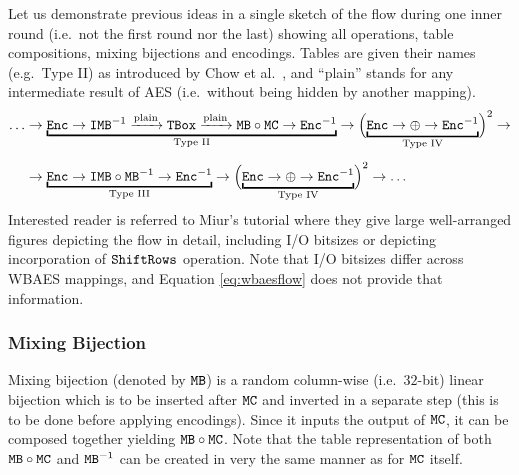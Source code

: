 	Let us demonstrate previous ideas in a single sketch of the flow during one inner round (i.e.\ not the first round nor the last) showing all operations, table compositions, mixing bijections and encodings. Tables are given their names (e.g.\ Type II) as introduced by Chow et al.\ \cite{chow2002aes}, and ``plain'' stands for any intermediate result of AES (i.e.\ without being hidden by another mapping).
	\begin{align}
	\label{eq:wbaesflow}
		\ldots&\rarr\underbracket{\Enc\rarr\IMB^{-1}\xrightarrow{\textnormal{plain}}\TBox\xrightarrow{\textnormal{plain}}\MB\circ\MC\rarr\Enc^{-1}}_{\textnormal{Type II}}\rarr\Bigl(\underbracket{\Enc\rarr\xor\rarr\Enc^{-1}}_{\textnormal{Type IV}}\Bigr)^2\rarr\nonumber\\[.5em]
		&\rarr\underbracket{\Enc\rarr\IMB\circ\MB^{-1}\rarr\Enc^{-1}}_{\textnormal{Type III}}\rarr\Bigl(\underbracket{\Enc\rarr\xor\rarr\Enc^{-1}}_{\textnormal{Type IV}}\Bigr)^2\rarr\ldots
	\end{align}
	Interested reader is referred to Miur's tutorial \cite{muir2013tutorial} where they give large well-arranged figures depicting the flow in detail, including I/O bitsizes or depicting incorporation of $\texttt{ShiftRows}$ operation. Note that I/O bitsizes differ across WBAES mappings, and Equation \ref{eq:wbaesflow} does not provide that information.
	

\subsubsection{Mixing Bijection}
	
	Mixing bijection (denoted by $\texttt{MB}$) is a random column-wise (i.e.\ $32$-bit) linear bijection which is to be inserted after $\texttt{MC}$ and inverted in a separate step (this is to be done before applying encodings). Since it inputs the output of $\texttt{MC}$, it can be composed together yielding $\texttt{MB}\circ\texttt{MC}$. Note that the table representation of both $\texttt{MB}\circ\texttt{MC}$ and $\texttt{MB}^{-1}$ can be created in very the same manner as for $\texttt{MC}$ itself.
	
